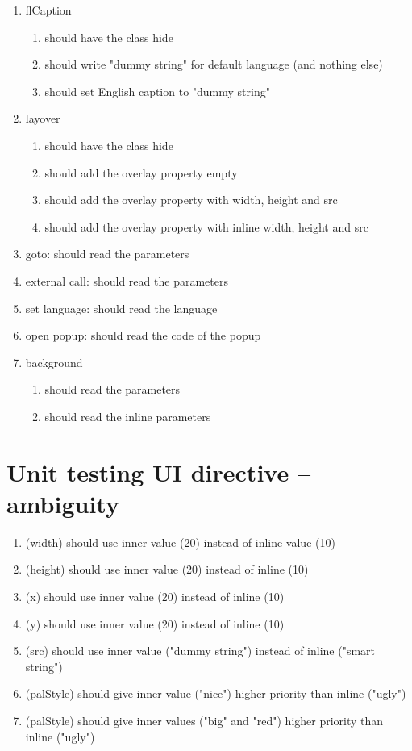 \begin{singlespace}
\begin{enumerate}
\item     flCaption
\begin{enumerate}
\item         should have the class hide
\item         should write "dummy string" for default language (and nothing else)
\item         should set English caption to "dummy string"
\end{enumerate}
\item     layover
\begin{enumerate}
\item         should have the class hide
\item         should add the overlay property empty
\item         should add the overlay property with width, height and src
\item         should add the overlay property with inline width, height and src
\end{enumerate}
\item     goto: should read the parameters
\item     external call: should read the parameters
\item     set language: should read the language
\item     open popup: should read the code of the popup
\item     background
\begin{enumerate}
\item         should read the parameters
\item         should read the inline parameters
\end{enumerate}
\end{enumerate}

\section{Unit testing UI directive -- ambiguity}
\begin{enumerate}
\item     (width) should use inner value (20) instead of inline value (10)
\item     (height) should use inner value (20) instead of inline (10)
\item     (x) should use inner value (20) instead of inline (10)
\item     (y) should use inner value (20) instead of inline (10)
\item     (src) should use inner value ("dummy string") instead of inline ("smart string")
\item     (palStyle) should give inner value ("nice") higher priority than inline ("ugly")
\item     (palStyle) should give inner values ("big" and "red") higher priority than inline ("ugly")
\end{enumerate}


\end{singlespace}
